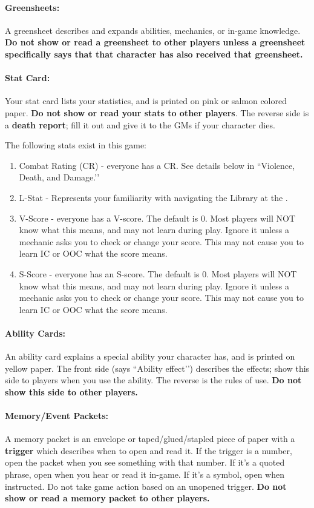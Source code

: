 \documentclass[sheet]{GL2020}
\begin{document}
\paragraph{Greensheets:} A greensheet describes and expands abilities, mechanics, or in-game knowledge.\textbf{ Do not show or read a greensheet to other players unless a greensheet specifically says that that character has also received that greensheet.}

\paragraph{Stat Card:} Your stat card lists your statistics, and is printed on pink or salmon colored paper. \textbf{Do not show or read your stats to other players}. The reverse side is a {\bf death report}; fill it out and give it to the GMs if your character dies.

The following stats exist in this game:
\begin{enumerate}
	\item Combat Rating (CR) - everyone has a CR. See details below in ``Violence, Death, and Damage.’’
	\item L-Stat - Represents your familiarity with navigating the Library at the \pSc{}.
	\item V-Score - everyone has a V-score. The default is 0. Most players will NOT know what this means, and may not learn during play. Ignore it unless a mechanic asks you to check or change your score. This may not cause you to learn IC or OOC what the score means.
	\item S-Score - everyone has an S-score. The default is 0. Most players will NOT know what this means, and may not learn during play. Ignore it unless a mechanic asks you to check or change your score. This may not cause you to learn IC or OOC what the score means.
\end{enumerate}

\paragraph{Ability Cards:} An ability card explains a special ability your character has, and is printed on yellow paper. The front side (says ``Ability effect'’) describes the effects; show this side to players when you use the ability. The reverse is the rules of use. \textbf{Do not show this side to other players.}

\paragraph{Memory/Event Packets:} A memory packet is an envelope or taped/glued/stapled piece of paper with a {\bf trigger} which describes when to open and read it. If the trigger is a number, open the packet when you see something with that number. If it's a quoted phrase, open when you hear or read it in-game. If it's a symbol, open when instructed. Do not take game action based on an unopened trigger. \textbf{Do not show or read a memory packet to other players.}
\end{document}
